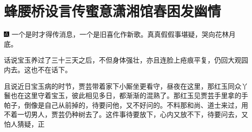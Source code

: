 

\chapter{蜂腰桥设言传蜜意\hspace{.5em}潇湘馆春困发幽情}

{\includegraphics[width=3mm]{../Images/00005}  \kaishu 一个是时才得传消息，一个是旧喜化作新歌。真真假假事堪疑，哭向花林月底。}

话说宝玉养过了三十三天之后，不但身体强壮，亦且连脸上疮痕平复，仍回大观园内去。这也不在话下。

且说近日宝玉病的时节，贾芸带着家下小厮坐更看守，昼夜在这里，那红玉同众丫鬟也在这里守着宝玉，彼此相见多日，都渐渐的混熟了。那红玉见贾芸手里拿的手帕子，倒像是自己从前掉的，待要问他，又不好问的。不料那和尚、道士来过，用不着一切男人，贾芸仍种树去了。这件事待要放下，心内又放不下，待要问去，又怕人猜疑，正